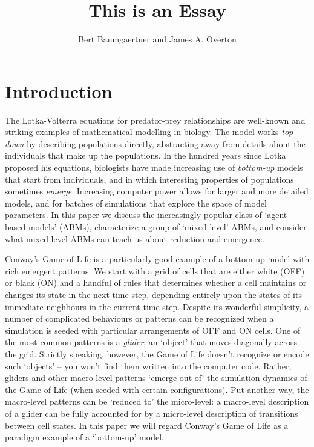 \documentclass[11pt]{article}
\title{This is an Essay}
\author{Bert Baumgaertner and James A. Overton}
\date{}
\begin{document}




\section{Introduction}


The Lotka-Volterra equations for predator-prey relationships are well-known and striking examples of mathematical modelling in biology. The model works \emph{top-down} by describing populations directly, abstracting away from details about the individuals that make up the populations. In the hundred years since Lotka proposed his equations, biologists have made increasing use of \emph{bottom-up} models that start from individuals, and in which interesting properties of populations sometimes \emph{emerge}. Increasing computer power allows for larger and more detailed models, and for batches of simulations that explore the space of model parameters. In this paper we discuss the increasingly popular class of `agent-based models' (ABMs), characterize a group of `mixed-level' ABMs, and consider what mixed-level ABMs can teach us about reduction and emergence.


Conway's Game of Life is a particularly good example of a bottom-up model with rich emergent patterns. We start with a grid of cells that are either white (OFF) or black (ON) and a handful of rules that determines whether a cell maintains or changes its state in the next time-step, depending entirely upon the states of its immediate neighbours in the current time-step.  Despite its wonderful simplicity, a number of complicated behaviours or patterns can be recognized when a simulation is seeded with particular arrangements of OFF and ON cells.  One of the most common patterns is a \emph{glider}, an `object' that moves diagonally across the grid.  Strictly speaking, however, the Game of Life doesn't recognize or encode such `objects' -- you won't find them written into the computer code. Rather, gliders and other macro-level patterns `emerge out of' the simulation dynamics of the Game of Life (when seeded with certain configurations). Put another way, the macro-level patterns can be `reduced to' the micro-level: a macro-level description of a glider can be fully accounted for by a micro-level description of transitions between cell states.  In this paper we will regard Conway's Game of Life as a paradigm example of a `bottom-up' model. 
\end{document}

